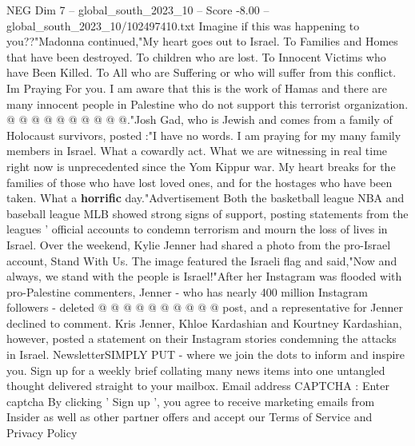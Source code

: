 \begin{textsample}{NEG Dim 7 – global\_south\_2023\_10 – Score -8.00 – global\_south\_2023\_10/102497410.txt}
Imagine if this was happening to you??"Madonna continued,"My heart goes out to Israel.
To Families and Homes that have been destroyed.
To children who are lost.
To Innocent Victims who have Been Killed.
To All who are Suffering or who will suffer from this conflict.
Im Praying For you.
I am aware that this is the work of Hamas and there are many innocent people in Palestine who do not support this terrorist organization. @ @ @ @ @ @ @ @ @ @."Josh Gad, who is Jewish and comes from a family of Holocaust survivors, posted :"I have no words.
I am praying for my many family members in Israel.
What a cowardly act.
What we are witnessing in real time right now is unprecedented since the Yom Kippur war.
My heart breaks for the families of those who have lost loved ones, and for the hostages who have been taken.
What a \textbf{horrific} day."Advertisement Both the basketball league NBA and baseball league MLB showed strong signs of support, posting statements from the leagues ' official accounts to condemn terrorism and mourn the loss of lives in Israel.
Over the weekend, Kylie Jenner had shared a photo from the pro-Israel account, Stand With Us.
The image featured the Israeli flag and said,"Now and always, we stand with the people is Israel!"After her Instagram was flooded with pro-Palestine commenters, Jenner - who has nearly 400 million Instagram followers - deleted @ @ @ @ @ @ @ @ @ @ post, and a representative for Jenner declined to comment.
Kris Jenner, Khloe Kardashian and Kourtney Kardashian, however, posted a statement on their Instagram stories condemning the attacks in Israel.
NewsletterSIMPLY PUT - where we join the dots to inform and inspire you.
Sign up for a weekly brief collating many news items into one untangled thought delivered straight to your mailbox.
Email address CAPTCHA : Enter captcha By clicking ' Sign up ', you agree to receive marketing emails from Insider as well as other partner offers and accept our Terms of Service and Privacy Policy

\end{textsample}
